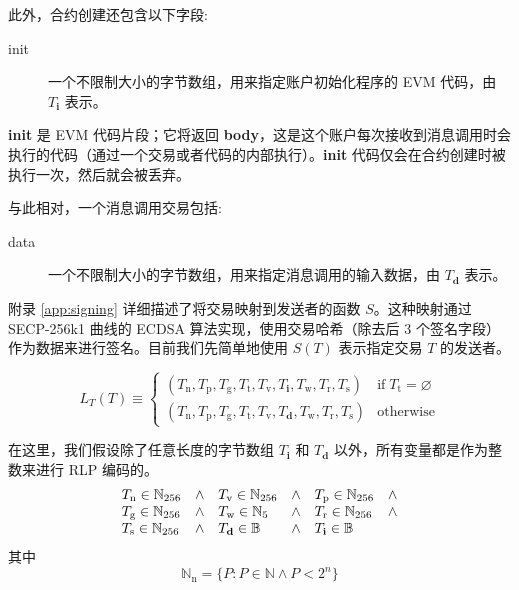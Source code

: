 \documentclass[9pt,oneside]{amsart}
\begin{document}
\begin{multicols}{2}
此外，合约创建还包含以下字段:

\begin{description}
\item[init] 一个不限制大小的字节数组，用来指定账户初始化程序的 EVM 代码，由 $T_{\mathbf{i}}$ 表示。
\end{description}

\textbf{init} 是 EVM 代码片段；它将返回 \textbf{body}，这是这个账户每次接收到消息调用时会执行的代码（通过一个交易或者代码的内部执行）。\textbf{init} 代码仅会在合约创建时被执行一次，然后就会被丢弃。

与此相对，一个消息调用交易包括:

\begin{description}
\item[data] 一个不限制大小的字节数组，用来指定消息调用的输入数据，由 $T_\mathbf{d}$ 表示。
\end{description}

附录 \ref{app:signing} 详细描述了将交易映射到发送者的函数 $S$。这种映射通过 SECP-256k1 曲线的 ECDSA 算法实现，使用交易哈希（除去后 3 个签名字段）作为数据来进行签名。目前我们先简单地使用 $S(T)$ 表示指定交易 $T$ 的发送者。

\begin{equation}
L_{T}(T) \equiv \begin{cases}
(T_{\mathrm{n}}, T_{\mathrm{p}}, T_{\mathrm{g}}, T_{\mathrm{t}}, T_{\mathrm{v}}, T_{\mathbf{i}}, T_{\mathrm{w}}, T_{\mathrm{r}}, T_{\mathrm{s}}) & \text{if} \; T_{\mathrm{t}} = \varnothing\\
(T_{\mathrm{n}}, T_{\mathrm{p}}, T_{\mathrm{g}}, T_{\mathrm{t}}, T_{\mathrm{v}}, T_{\mathbf{d}}, T_{\mathrm{w}}, T_{\mathrm{r}}, T_{\mathrm{s}}) & \text{otherwise}
\end{cases}
\end{equation}

在这里，我们假设除了任意长度的字节数组 $T_{\mathbf{i}}$ 和 $T_{\mathbf{d}}$ 以外，所有变量都是作为整数来进行 RLP 编码的。
\begin{equation}
\begin{array}[t]{lclclc}
T_{\mathrm{n}} \in \mathbb{N}_{256} & \wedge & T_{\mathrm{v}} \in \mathbb{N}_{256} & \wedge & T_{\mathrm{p}} \in \mathbb{N}_{256} & \wedge \\
T_{\mathrm{g}} \in \mathbb{N}_{256} & \wedge & T_{\mathrm{w}} \in \mathbb{N}_5 & \wedge & T_{\mathrm{r}} \in \mathbb{N}_{256} & \wedge \\
T_{\mathrm{s}} \in \mathbb{N}_{256} & \wedge & T_{\mathbf{d}} \in \mathbb{B} & \wedge & T_{\mathbf{i}} \in \mathbb{B}
\end{array}
\end{equation}
其中
\begin{equation}
\mathbb{N}_{\mathrm{n}} = \{ P: P \in \mathbb{N} \wedge P < 2^n \}
\end{equation}


\end{multicols}
\end{document}
